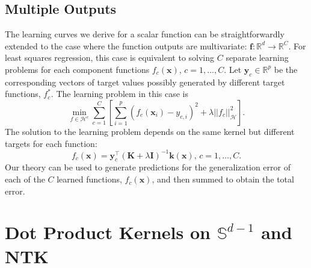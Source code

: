 \documentclass{article}
\begin{document}
\subsection{Multiple Outputs}\label{Multiple_Classes}
The learning curves we derive for a scalar function can be straightforwardly extended to the case where the function outputs are multivariate: $\mathbf{f}: \mathbb{R}^d \to \mathbb{R}^{C}$. For least squares regression, this case is equivalent to solving $C$ separate learning problems for each component functions $f_c(\mathbf{x})$, $c=1,...,C$. Let %
$\mathbf{y}_c\in\mathbb{R}^{p}$ be the corresponding vectors of target values possibly generated by different target functions, $f^*_c$. The learning problem in this case is
\begin{equation}
    \min_{f\in\mathcal{H}^c} \sum_{c=1}^C \left[ \sum_{i=1}^p (f_c(\mathbf{x}_i) - y_{c,i})^2 + \lambda ||f_c||_{\mathcal{H}}^2 \right].
\end{equation}
%
The solution to the learning problem depends on the same kernel but different targets for each function:
\begin{equation}
    f_c(\mathbf{x}) = \mathbf{y}^\top_c (\mathbf{K} + \lambda \mathbf{I})^{-1} \mathbf{k}(\mathbf{x}), %
    \, c = 1,\ldots,C.
\end{equation}
%
Our theory can be used to generate predictions for the generalization error of each of the $C$ learned functions, $f_c(\mathbf{x})$, and then summed to obtain the total error. %

\section{Dot Product Kernels on $\mathbb{S}^{d-1}$ and NTK}\label{SecDot}
\end{document}
